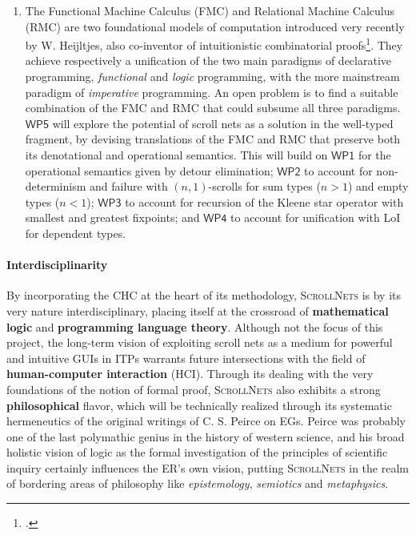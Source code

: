 \documentclass[12pt,draftproposal]{msca-pf}
\newcommand{\proj}{\small\textsc{ScrollNets}}
\newcommand{\WP}[1]{$\mathsf{WP#1}$}
\begin{document}
\begin{enumerate}
    \item The Functional Machine Calculus (FMC) and Relational Machine Calculus (RMC) are two
    foundational models of computation introduced very recently by W. Heijltjes, also co-inventor of
    intuitionistic combinatorial
    proofs\footcite{heijltjesFunctionalMachineCalculus2023,barrettRelationalMachineCalculus2024,heijltjes_intuitionistic_2019}.
    They achieve respectively a unification of the two main paradigms of declarative programming,
    \emph{functional} and \emph{logic} programming, with the more mainstream paradigm of
    \emph{imperative} programming. An open problem is to find a suitable combination of the FMC and
    RMC that could subsume all three paradigms. \WP{5} will explore the potential of scroll nets as
    a solution in the well-typed fragment, by devising translations of the FMC and RMC that preserve
    both its denotational and operational semantics. This will build on \WP{1} for the operational
    semantics given by detour elimination; \WP{2} to account for non-determinism and failure with
    $(n,1)$-scrolls for sum types ($n > 1$) and empty types ($n < 1$); \WP{3} to account for
    recursion of the Kleene star operator with smallest and greatest fixpoints; and \WP{4} to
    account for unification with LoI for dependent types.
\end{enumerate}

\paragraph{Interdisciplinarity} By incorporating the CHC at the heart of its methodology, {\proj} is
by its very nature interdisciplinary, placing itself at the crossroad of \textbf{mathematical logic}
and \textbf{programming language theory}. Although not the focus of this project, the long-term
vision of exploiting scroll nets as a medium for powerful and intuitive GUIs in ITPs warrants future
intersections with the field of \textbf{human-computer interaction} (HCI). Through its dealing with
the very foundations of the notion of formal proof, {\proj} also exhibits a strong
\textbf{philosophical} flavor, which will be technically realized through its systematic
hermeneutics of the original writings of C. S. Peirce on EGs. Peirce was probably one of the last
polymathic genius in the history of western science, and his broad holistic vision of logic as the
formal investigation of the principles of scientific inquiry certainly influences the ER's own
vision, putting {\proj} in the realm of bordering areas of philosophy like \emph{epistemology},
\emph{semiotics} and \emph{metaphysics}.
\end{document}
